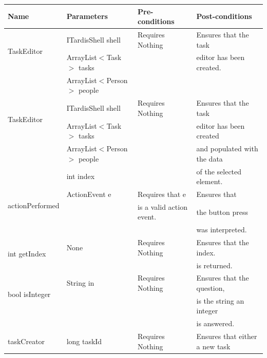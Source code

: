 \begin{tabular}{| l | l | l | l |}
\hline
Name & Parameters & Pre-conditions & Post-conditions\\
\hline
\multirow{2}{*}{TaskEditor} & ITardisShell shell                         & Requires Nothing & Ensures that the task\\ 
			          & ArrayList$<$Task$>$ tasks       &                             & editor has been created.\\ 
                                              & ArrayList$<$Person$>$ people &                             & 
\\
\hline
\multirow{2}{*}{TaskEditor} & ITardisShell shell                         & Requires Nothing & Ensures that the task\\ 
			          & ArrayList$<$Task$>$ tasks       &                             & editor has been created\\ 
                                              & ArrayList$<$Person$>$ people &                             & and populated with the data\\
			          & int index                                      &                             & of the selected element.
\\
\hline
\multirow{2}{*}{actionPerformed} & ActionEvent e & Requires that e            & Ensures that\\
                                                        &                        & is a valid action event. & the button press\\
                                                        &                        &                                      & was interpreted.
\\
\hline
\multirow{2}{*}{int getIndex} & None & Requires Nothing & Ensures that the index.\\
		                         &           &                             & is returned.
\\
\hline
\multirow{2}{*}{bool isInteger} & String in & Requires Nothing & Ensures that the question,\\
		 	                &               &                             & is the string an integer\\
		 	                &               &                             & is answered.
\\
\hline
\multirow{2}{*}{taskCreator} & long taskId                    & Requires Nothing & Ensures that either a new task\\

\end{tabular}
